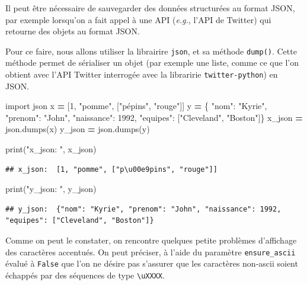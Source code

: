 \documentclass[
  12pt,
]{book}
\newenvironment{Shaded}{\begin{snugshade}}{\end{snugshade}}
\newcommand{\BuiltInTok}[1]{#1}
\newcommand{\DecValTok}[1]{\textcolor[rgb]{0.00,0.00,0.81}{#1}}
\newcommand{\ImportTok}[1]{#1}
\newcommand{\NormalTok}[1]{#1}
\newcommand{\OperatorTok}[1]{\textcolor[rgb]{0.81,0.36,0.00}{\textbf{#1}}}
\newcommand{\StringTok}[1]{\textcolor[rgb]{0.31,0.60,0.02}{#1}}
\numberwithin{equation}{section}
\numberwithin{countremarque}{section}
\begin{document}
Il peut être nécessaire de sauvegarder des données structurées au format JSON, par exemple lorsqu'on a fait appel à une API (\emph{e.g.}, l'API de Twitter) qui retourne des objets au format JSON.

Pour ce faire, nous allons utiliser la librairire \texttt{json}, et sa méthode \texttt{dump()}. Cette méthode permet de sérialiser un objet (par exemple une liste, comme ce que l'on obtient avec l'API Twitter interrogée avec la libraririe \texttt{twitter-python}) en JSON.

\begin{Shaded}
\begin{Highlighting}[]
\ImportTok{import}\NormalTok{ json}
\NormalTok{x }\OperatorTok{=}\NormalTok{ [}\DecValTok{1}\NormalTok{, }\StringTok{"pomme"}\NormalTok{, [}\StringTok{"pépins"}\NormalTok{, }\StringTok{"rouge"}\NormalTok{]]}
\NormalTok{y }\OperatorTok{=}\NormalTok{ \{ }\StringTok{"nom"}\NormalTok{: }\StringTok{"Kyrie"}\NormalTok{,}
  \StringTok{"prenom"}\NormalTok{: }\StringTok{"John"}\NormalTok{,}
  \StringTok{"naissance"}\NormalTok{: }\DecValTok{1992}\NormalTok{,}
  \StringTok{"equipes"}\NormalTok{: [}\StringTok{"Cleveland"}\NormalTok{, }\StringTok{"Boston"}\NormalTok{]\}}
\NormalTok{x\_json }\OperatorTok{=}\NormalTok{ json.dumps(x)}
\NormalTok{y\_json }\OperatorTok{=}\NormalTok{ json.dumps(y)}

\BuiltInTok{print}\NormalTok{(}\StringTok{"x\_json: "}\NormalTok{, x\_json)}
\end{Highlighting}
\end{Shaded}

\begin{lstlisting}
## x_json:  [1, "pomme", ["p\u00e9pins", "rouge"]]
\end{lstlisting}

\begin{Shaded}
\begin{Highlighting}[]
\BuiltInTok{print}\NormalTok{(}\StringTok{"y\_json: "}\NormalTok{, y\_json)}
\end{Highlighting}
\end{Shaded}

\begin{lstlisting}
## y_json:  {"nom": "Kyrie", "prenom": "John", "naissance": 1992, "equipes": ["Cleveland", "Boston"]}
\end{lstlisting}

Comme on peut le constater, on rencontre quelques petite problèmes d'affichage des caractères accentués. On peut préciser, à l'aide du paramètre \texttt{ensure\_ascii} évalué à \texttt{False} que l'on ne désire pas s'assurer que les caractères non-ascii soient échappés par des séquences de type \texttt{\textbackslash{}uXXXX}.
\end{document}
